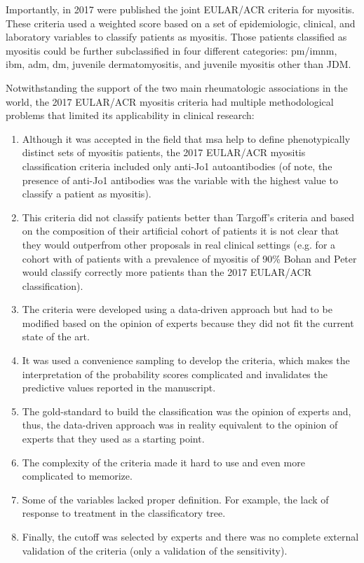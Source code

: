 Importantly, in 2017 were published the joint EULAR/ACR criteria for myositis.\cite{Lundberg2017} These criteria used a weighted score based on a set of epidemiologic, clinical, and laboratory variables to classify patients as myositis. Those patients classified as myositis could be further subclassified in four different categories: \gls{pm}/\gls{imnm}, \gls{ibm}, \gls{adm}, \gls{dm}, juvenile dermatomyositis, and juvenile myositis other than JDM.\cite{Lundberg2017}

Notwithstanding the support of the two main rheumatologic associations in the world, the 2017 EULAR/ACR myositis criteria had multiple methodological problems that limited its applicability in clinical research:

\begin{enumerate}
	\item Although it was accepted in the field that \gls{msa} help to define phenotypically distinct sets of myositis patients, the 2017 EULAR/ACR myositis classification criteria included only anti-Jo1 autoantibodies (of note, the presence of anti-Jo1 antibodies was the variable with the highest value to classify a patient as myositis).
	
	\item This criteria did not classify patients better than Targoff's criteria and based on the composition of their artificial cohort of patients it is not clear that they would outperfrom other proposals in real clinical settings (e.g. for a cohort with of patients with a prevalence of myositis of 90\% Bohan and Peter would classify correctly more patients than the 2017 EULAR/ACR classification).
	
	\item The criteria were developed using a data-driven approach but had to be modified based on the opinion of experts because they did not fit the current state of the art.
	
	\item It was used a convenience sampling to develop the criteria, which makes the interpretation of the probability scores complicated and invalidates the predictive values reported in the manuscript.
	
	\item The gold-standard to build the classification was the opinion of experts and, thus, the data-driven approach was in reality equivalent to the opinion of experts that they used as a starting point.
	
	\item The complexity of the criteria made it hard to use and even more complicated to memorize.
	
	\item Some of the variables lacked proper definition. For example, the lack of response to treatment in the classificatory tree.
	
	\item Finally, the cutoff was selected by experts and there was no complete external validation of the criteria (only a validation of the sensitivity).
\end{enumerate}

